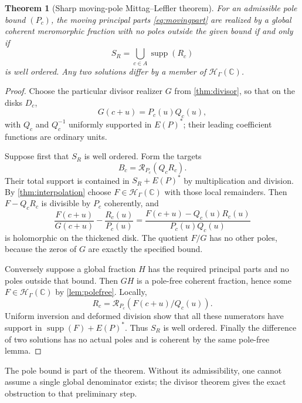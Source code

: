 \documentclass[11pt,letterpaper]{article}
\newtheorem{theorem}{Theorem}[section]
\theoremstyle{definition}
\theoremstyle{remark}
\newcommand{\C}{\mathbb C}
\newcommand{\HH}{\mathscr H_\Gamma}
\newcommand{\supp}{\operatorname{supp}}
\newcommand{\jet}{\mathcal R}
\numberwithin{equation}{section}
\begin{document}
\begin{theorem}[Sharp moving-pole Mittag--Leffler theorem]\label{thm:ML}
For an admissible pole bound $(P_c)$, the moving principal parts \eqref{eq:movingpart} are realized by a global coherent meromorphic fraction with no poles outside the given bound if and only if
\begin{equation}\label{eq:MLsupport}
 S_R=\bigcup_{c\in A}\supp(R_c)
\end{equation}
is well ordered. Any two solutions differ by a member of $\HH(\C)$.
\end{theorem}
\begin{proof}
Choose the particular divisor realizer $G$ from \cref{thm:divisor}, so that on the disks $D_c$,
\[
 G(c+u)=P_c(u)Q_c(u),
\]
with $Q_c$ and $Q_c^{-1}$ uniformly supported in $E(P)^*$; their leading coefficient functions are ordinary units.

Suppose first that $S_R$ is well ordered. Form the targets
\[
 B_c=\jet_{P_c}(Q_cR_c).
\]
Their total support is contained in $S_R+E(P)^*$ by multiplication and division. By \cref{thm:interpolation} choose $F\in\HH(\C)$ with those local remainders. Then $F-Q_cR_c$ is divisible by $P_c$ coherently, and
\[
 \frac{F(c+u)}{G(c+u)}-\frac{R_c(u)}{P_c(u)}
 =\frac{F(c+u)-Q_c(u)R_c(u)}{P_c(u)Q_c(u)}
\]
is holomorphic on the thickened disk. The quotient $F/G$ has no other poles, because the zeros of $G$ are exactly the specified bound.

Conversely suppose a global fraction $H$ has the required principal parts and no poles outside that bound. Then $GH$ is a pole-free coherent fraction, hence some $F\in\HH(\C)$ by \cref{lem:polefree}. Locally,
\[
 R_c=\jet_{P_c}(F(c+u)/Q_c(u)).
\]
Uniform inversion and deformed division show that all these numerators have support in $\supp(F)+E(P)^*$. Thus $S_R$ is well ordered. Finally the difference of two solutions has no actual poles and is coherent by the same pole-free lemma.
\end{proof}
The pole bound is part of the theorem. Without its admissibility, one cannot assume a single global denominator exists; the divisor theorem gives the exact obstruction to that preliminary step.
\end{document}
